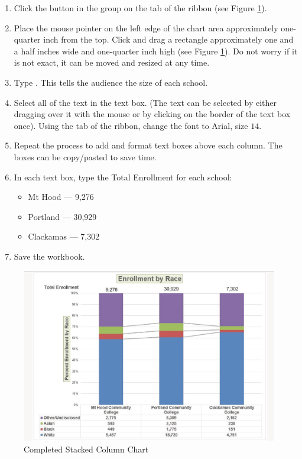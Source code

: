 \begin{enumerate}
	\item Click the  button in the  group on the  tab of the ribbon (see Figure \ref{04:fig42}). 
	\item Place the mouse pointer on the left edge of the chart area approximately one-quarter inch from the top. Click and drag a rectangle approximately one and a half inches wide and one-quarter inch high (see Figure \ref{04:fig42}). Do not worry if it is not exact, it can be moved and resized at any time.
	\item Type . This tells the audience the size of each school.
	\item Select all of the text in the text box. (The text can be selected by either dragging over it with the mouse or by clicking on the border of the text box once). Using the  tab of the ribbon, change the font to Arial, size $ 14 $.
	\item Repeat the process to add and format text boxes above each column. The boxes can be copy/pasted to save time.
	\item In each text box, type the Total Enrollment for each school:

	\begin{itemize}
		\item Mt Hood --- 9,276
		\item Portland --- 30,929
		\item Clackamas --- 7,302
	\end{itemize}

	\item Save the workbook.

\end{enumerate}

\begin{figure}[H]
	\centering
	\includegraphics[width=\maxwidth{.95\linewidth}]{gfx/ch04_fig42}
	\caption{Completed Stacked Column Chart}
	\label{04:fig42}
\end{figure}



